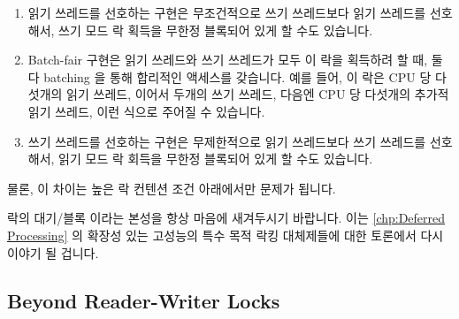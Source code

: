 \begin{enumerate}
\item
	읽기 쓰레드를 선호하는 구현은 무조건적으로 쓰기 쓰레드보다 읽기
	쓰레드를 선호해서, 쓰기 모드 락 획득을 무한정 블록되어 있게 할 수도
	있습니다.
\item	Batch-fair 구현은 읽기 쓰레드와 쓰기 쓰레드가 모두 이 락을 획득하려 할
	때, 둘 다 batching 을 통해 합리적인 액세스를 갖습니다.
	예를 들어, 이 락은 CPU 당 다섯개의 읽기 쓰레드, 이어서 두개의 쓰기
	쓰레드, 다음엔 CPU 당 다섯개의 추가적 읽기 쓰레드, 이런 식으로 주어질
	수 있습니다.
\item	쓰기 쓰레드를 선호하는 구현은 무제한적으로 읽기 쓰레드보다 쓰기
	쓰레드를 선호해서, 읽기 모드 락 회득을 무한정 블록되어 있게 할 수도
	있습니다.

\end{enumerate}

물론, 이 차이는 높은 락 컨텐션 조건 아래에서만 문제가 됩니다.

락의 대기/블록 이라는 본성을 항상 마음에 새겨두시기 바랍니다.
이는 \cref{chp:Deferred Processing} 의 확장성 있는 고성능의 특수 목적 락킹
대체제들에 대한 토론에서 다시 이야기 될 겁니다.

\subsection{Beyond Reader-Writer Locks}
\label{sec:locking:Beyond Reader-Writer Locks}

